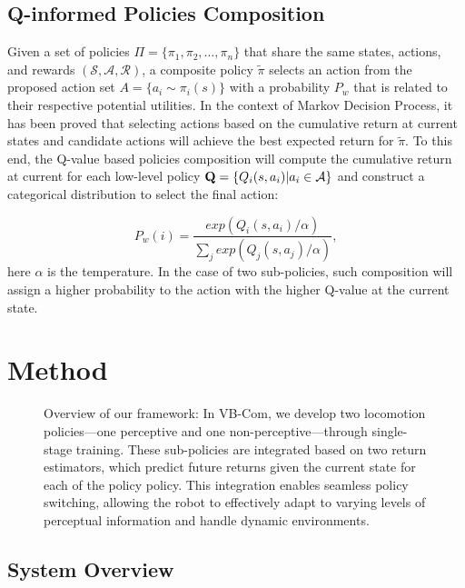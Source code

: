 \subsection{Q-informed Policies Composition}

Given a set of policies $\Pi = \{\pi_1, \pi_2, \dots, \pi_n \}$ that share the same states, actions, and rewards $(\mathcal{S}, \mathcal{A}, \mathcal{R})$, a composite policy $\tilde{\pi}$ selects an action from the proposed action set $A = \{ a_i \sim \pi_i(s) \}$ with a probability $P_w$ that is related to their respective potential utilities. In the context of Markov Decision Process, it has been proved \cite{zhang2023policy} that selecting actions based on the cumulative return at current states and candidate actions will achieve the best expected return for $\tilde{\pi}$. To this end, the Q-value based policies composition will compute the cumulative return at current for each low-level policy $\bold{Q} = \{ Q_i(s, a_i) | a_i \in \mathcal{A} \}$ and construct a categorical distribution to select the final action:

\begin{equation}
    P_w(i)= \frac{exp(Q_i(s, a_i)/\alpha)}{\sum_j exp(Q_j(s, a_j)/\alpha)},
\end{equation}
here $\alpha$ is the temperature. In the case of two sub-policies, such composition will assign a higher probability to the action with the higher Q-value at the current state.

\section{Method} \label{sec:method}

\begin{figure*}[h]
\caption{Overview of our framework: In VB-Com, we develop two locomotion policies—one perceptive and one non-perceptive—through single-stage training. These sub-policies are integrated based on two return estimators, which predict future returns given the current state for each of the policy policy. This integration enables seamless policy switching, allowing the robot to effectively adapt to varying levels of perceptual information and handle dynamic environments.}
\label{method}
\end{figure*}


\subsection{System Overview}


